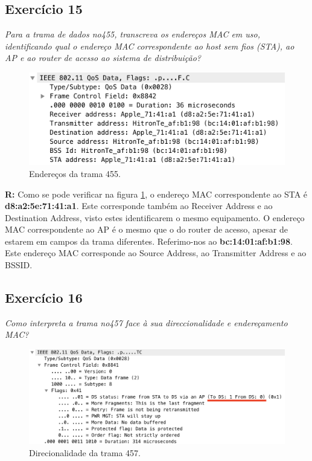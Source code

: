 \documentclass{llncs}
\begin{document}
\subsection{Exercício 15}
\emph{Para a trama de dados no455, transcreva os endereços MAC em uso, identificando qual o endereço MAC correspondente ao host sem fios (STA), ao AP e ao router de acesso ao sistema de distribuição?}
\begin{figure}[H]
\begin{center}
\includegraphics[scale=0.30]{15.png} 
\end{center}
\caption{\label{fig:15}Endereços da trama 455.}
\end{figure} 
\par
\textbf{R:} Como se pode verificar na figura \ref{fig:15}, o endereço MAC correspondente ao STA é \textbf{d8:a2:5e:71:41:a1}. Este corresponde também ao Receiver Address e ao Destination Address, visto estes identificarem o mesmo equipamento. O endereço MAC correspondente ao AP é o mesmo que o do router de acesso, apesar de estarem em campos da trama diferentes. Referimo-nos ao \textbf{bc:14:01:af:b1:98}. Este endereço MAC corresponde ao Source Address, ao Transmitter Address e ao BSSID.


\subsection{Exercício 16}
\emph{Como interpreta a trama no457 face à sua direccionalidade e endereçamento MAC?}
\begin{figure}[H]
\begin{center}
\includegraphics[scale=0.30]{16.png} 
\end{center}
\caption{\label{fig:16}Direcionalidade da trama 457.}
\end{figure} 
\end{document}
